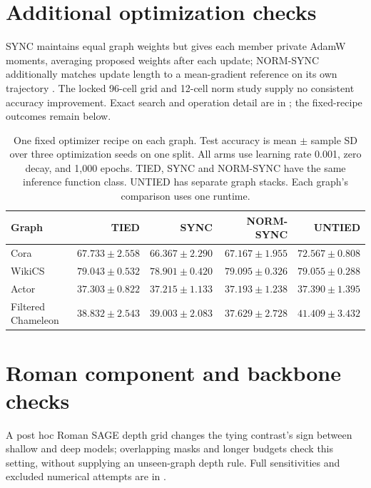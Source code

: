 \section{Additional optimization checks}\label{app:optimizer-history}
SYNC maintains equal graph weights but gives each member private AdamW moments, averaging proposed weights after each update; NORM-SYNC additionally matches update length to a mean-gradient reference on its own trajectory \citep{yang2023adatask}. The locked 96-cell grid and 12-cell norm study supply no consistent accuracy improvement. Exact search and operation detail are in ; the fixed-recipe outcomes remain below.

\begin{table}[t]
\centering
\caption{One fixed optimizer recipe on each graph. Test accuracy is mean $\pm$ sample SD over three optimization seeds on one split. All arms use learning rate 0.001, zero decay, and 1,000 epochs. TIED, SYNC and NORM-SYNC have the same inference function class. UNTIED has separate graph stacks. Each graph's comparison uses one runtime.}
\label{tab:optimizer-default}
\small
\setlength{\tabcolsep}{4pt}
\begin{tabular}{lrrrr}
\toprule
Graph & TIED & SYNC & NORM-SYNC & UNTIED\\
\midrule
Cora & $67.733 \pm 2.558$ & $66.367 \pm 2.290$ & $67.167 \pm 1.955$ & $72.567 \pm 0.808$\\
WikiCS & $79.043 \pm 0.532$ & $78.901 \pm 0.420$ & $79.095 \pm 0.326$ & $79.055 \pm 0.288$\\
Actor & $37.303 \pm 0.822$ & $37.215 \pm 1.133$ & $37.193 \pm 1.238$ & $37.390 \pm 1.395$\\
Filtered Chameleon & $38.832 \pm 2.543$ & $39.003 \pm 2.083$ & $37.629 \pm 2.728$ & $41.409 \pm 3.432$\\
\bottomrule
\end{tabular}
\end{table}

\section{Roman component and backbone checks}\label{app:depth-grid}
A post hoc Roman SAGE depth grid changes the tying contrast's sign between shallow and deep models; overlapping masks and longer budgets check this setting, without supplying an unseen-graph depth rule. Full sensitivities and excluded numerical attempts are in .

